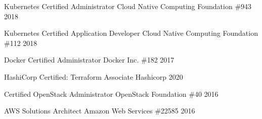 

\begin{cvhonors}

\cvhonor
    {Kubernetes Certified Administrator}
    {Cloud Native Computing Foundation}
    {\#943}
    {2018} %

  \cvhonor
    {Kubernetes Certified Application Developer}
    {Cloud Native Computing Foundation}
    {\#112}
    {2018} %

  \cvhonor
    {Docker Certified Administrator}
    {Docker Inc.}
    {\#182}
    {2017} %

\cvhonor
    {HashiCorp Certified: Terraform Associate}
    {Hashicorp}
    {}
    {2020} %

  \cvhonor
    {Certified OpenStack Administrator}
    {OpenStack Foundation}
    {\#40}
    {2016} %

  \cvhonor
    {AWS Solutions Architect}
    {Amazon Web Services}
    {\#22585}
    {2016} %


\end{cvhonors}

